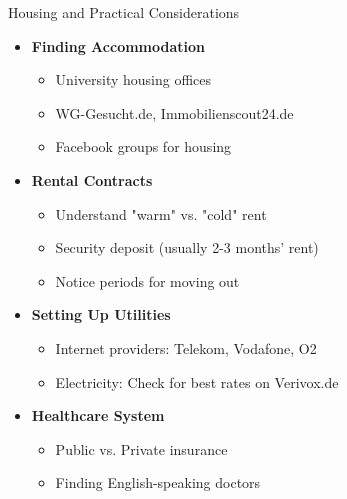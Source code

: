\documentclass[aspectratio=169,10pt]{beamer}
\begin{document}
\begin{frame}{Housing and Practical Considerations}
\begin{itemize}
    \item \textbf{Finding Accommodation}
    \begin{itemize}
        \item University housing offices
        \item WG-Gesucht.de, Immobilienscout24.de
        \item Facebook groups for housing
    \end{itemize}
    \item \textbf{Rental Contracts}
    \begin{itemize}
        \item Understand "warm" vs. "cold" rent
        \item Security deposit (usually 2-3 months' rent)
        \item Notice periods for moving out
    \end{itemize}
    \item \textbf{Setting Up Utilities}
    \begin{itemize}
        \item Internet providers: Telekom, Vodafone, O2
        \item Electricity: Check for best rates on Verivox.de
    \end{itemize}
    \item \textbf{Healthcare System}
    \begin{itemize}
        \item Public vs. Private insurance
        \item Finding English-speaking doctors
    \end{itemize}
\end{itemize}
\end{frame}
\end{document}

